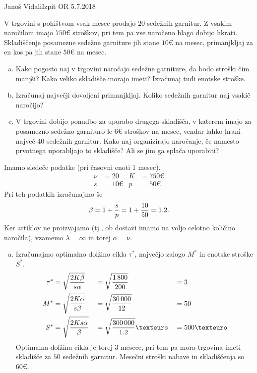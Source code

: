\begin{naloga}{Janoš Vidali}{Izpit OR 5.7.2018}
\begin{vprasanje}
V trgovini s pohištvom vsak mesec prodajo $20$ sedežnih garnitur.
Z vsakim naročilom imajo $750 €$ stroškov,
pri tem pa vse naročeno blago dobijo hkrati.
Skladiščenje posamezne sedežne garniture jih stane $10 €$ na mesec,
primanjkljaj za en kos pa jih stane $50 €$ na mesec.

\begin{enumerate}[(a)]
\item Kako pogosto naj v trgovini naročajo sedežne garniture,
da bodo stroški čim manjši?
Kako veliko skladišče morajo imeti?
Izračunaj tudi enotske stroške.

\item Izračunaj največji dovoljeni primanjkljaj.
Koliko sedežnih garnitur naj vsakič naročijo?

\item V trgovini dobijo ponudbo za uporabo drugega skladišča,
v katerem imajo za po\-sa\-mez\-no se\-dež\-no garnituro
le $6 €$ stroškov na mesec,
vendar lahko hrani največ $40$ sedežnih garnitur.
Kako naj organizirajo naročanje,
če namesto prvotnega uporabljajo to skladišče?
Ali se jim ga splača uporabiti?
\end{enumerate}
\end{vprasanje}

\begin{odgovor}
Imamo sledeče podatke (pri časovni enoti $1$ mesec).
\begin{align*}
\nu &= 20 &
K &= 750 € \\
s &= 10 € &
p &= 50 €
\end{align*}
Pri teh podatkih izračunajmo še
$$
\beta = 1 + {s \over p} = 1 + {10 \over 50} = 1.2 .
$$
Ker artiklov ne proizvajamo
(tj., ob dostavi imamo na voljo celotno količino naročila),
vzamemo $\lambda = \infty$ in torej $\alpha = \nu$.

\begin{enumerate}[(a)]
\item Izračunajmo optimalno dolžino cikla $\tau^*$,
največjo zalogo $M^*$ in enotske stroške $S^*$.
\begin{alignat*}{3}
\tau^* &= \sqrt{2K \beta \over s \alpha}
&&= \sqrt{1\,800 \over 200} &&= 3 \\
M^* &= \sqrt{2K \alpha \over s \beta}
&&= \sqrt{30\,000 \over 12} &&= 50 \\
S^* &= \sqrt{2Ks \alpha \over \beta}
&&= \sqrt{300\,000 \over 1.2} € &&= 500 €
\end{alignat*}
Optimalna dolžina cikla je torej $3$ mesece,
pri tem pa mora trgovina imeti skladišče za $50$ sedežnih garnitur.
Mesečni stroški nabave in skladiščenja so $60 €$.


\end{enumerate}
\end{odgovor}
\end{naloga}
